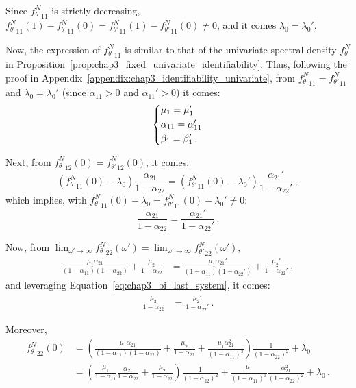 \begin{subappendices}
Since ${f_\theta^N}_{11}$ is strictly decreasing, ${f_\theta^N}_{11}(1)-{f_\theta^N}_{11}(0) = {f_{\theta'}^N}_{11}(1)-{f_{\theta'}^N}_{11}(0) \neq 0$, and it comes $\lambda_0 = \lambda_0'$.

Now, the expression of ${f_\theta^N}_{11}$ is similar to that of the univariate spectral density $f_\theta^N$ in Proposition~\ref{prop:chap3_fixed_univariate_identifiability}.
Thus, following the proof in Appendix~\ref{appendix:chap3_identifiability_univariate}, from ${f_\theta^N}_{11} = {f_{\theta'}^N}_{11}$ and $\lambda_0 = \lambda_0'$
(since $\alpha_{11} > 0$ and $\alpha_{11}'> 0$)
it comes:
\[
\begin{dcases}
\mu_1 = \mu_1' \nonumber\\
\alpha_{11} = \alpha_{11}'\nonumber\\
\beta_1 = \beta_1'\nonumber\,.
\end{dcases}
\]

Next, from ${f_\theta^N}_{12}(0) = {f_{\theta'}^N}_{12}(0)$, it comes:
\begin{equation*}
\left( {f_\theta^N}_{11}(0) - \lambda_0 \right) \frac{\alpha_{21}}{1-\alpha_{22}}
=
\left( {f_{\theta'}^N}_{11}(0) - \lambda_0' \right) \frac{\alpha_{21}'}{1-\alpha_{22}'} \,,
\end{equation*}
which implies, with ${f_\theta^N}_{11}(0) - \lambda_0 = {f_{\theta'}^N}_{11}(0) - \lambda_0' \neq 0$:
\begin{equation}\label{eq:chap3_bi_last_system}
\frac{\alpha_{21}}{1-\alpha_{22}} = \frac{\alpha_{21}'}{1-\alpha_{22}'}\,.
\end{equation}

Now, from $\lim_{\omega' \to \infty} {f_\theta^N}_{22}(\omega') = \lim_{\omega' \to \infty} {f_{\theta'}^N}_{22}(\omega')$,
\begin{align*}
\frac{\mu_1 \alpha_{21}}{(1-\alpha_{11})(1-\alpha_{22})} + \frac{\mu_2}{1-\alpha_{22}} &= \frac{\mu_1 \alpha_{21}'}{(1-\alpha_{11})(1-\alpha_{22}')} + \frac{\mu_2'}{1-\alpha_{22}'} \,,
\end{align*}
and leveraging Equation~\eqref{eq:chap3_bi_last_system}, it comes:
\begin{align}\label{eq:chap3_bi_last_equation}
\frac{\mu_2}{1-\alpha_{22}} &= \frac{\mu_2'}{1-\alpha_{22}'}\,.
\end{align}

Moreover,
\begin{align*}
{f_\theta^N}_{22}(0)
&= \left( \frac{\mu_1 \alpha_{21}}{(1-\alpha_{11})(1-\alpha_{22})} + \frac{\mu_2}{1-\alpha_{22}} + \frac{\mu_1\alpha_{21}^2}{(1-\alpha_{11})^3} \right) \frac{1}{(1-\alpha_{22})^2} + \lambda_0 \\
&= \left(
\frac{\mu_1}{1-\alpha_{11}} \frac{\alpha_{21}}{1-\alpha_{22}} +
\frac{\mu_2}{1-\alpha_{22}}
\right) \frac{1}{(1-\alpha_{22})^2} +
\frac{\mu_1}{(1-\alpha_{11})^3} \frac{\alpha_{21}^2}{(1-\alpha_{22})^2} + \lambda_0 \,.
\end{align*}


\end{subappendices}
